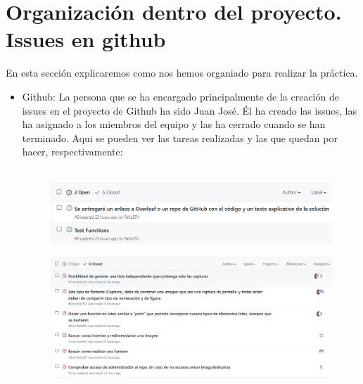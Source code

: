 \documentclass{article}
\begin{document}
\vspace{1cm}



\section{Organización dentro del proyecto. Issues en github}
\cuerpo En esta sección explicaremos como nos hemos organiado para realizar la práctica.\\

    \begin{itemize}
      
    	\item Github: La persona que se ha encargado principalmente de la creación de issues en el proyecto de Github ha sido Juan José. Él ha creado las issues, las ha asignado a los miembros del equipo y las ha cerrado cuando se han terminado. Aqui se pueden ver las tareas realizadas y las que quedan por hacer, respectivamente:\\\\
    	
    	\begin{figure}[h!]
        \centering
        \includegraphics[scale=0.65]{GIT1.PNG}
        \label{fig:cap1}
        \end{figure}
        
        \begin{figure}[h!]
        \centering
        \includegraphics[scale=0.55]{GIT2.PNG}
        \label{fig:cap1}
        \end{figure}


\end{itemize}
\end{document}
